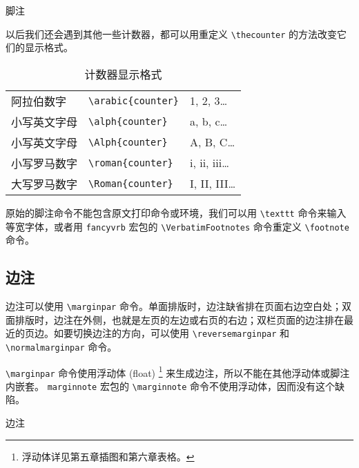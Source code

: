 \begin{example}[h]
\begin{Code}[numbers=left]
\renewcommand{\thefootnote}{\roman{footnote}} %
\end{Code}
\caption{脚注}
\label{exa:footnote}
\end{example}

以后我们还会遇到其他一些计数器，都可以用重定义 \verb|\thecounter| 的方法改变它们的显示格式。

\begin{table}
\centering
\caption{计数器显示格式}
\label{tab:counter_format}
\begin{tabular}{lll}
    \toprule
    阿拉伯数字 & \verb|\arabic{counter}| & 1, 2, 3\dots \\
    小写英文字母 & \verb|\alph{counter}| & a, b, c\dots \\
    小写英文字母 & \verb|\Alph{counter}| & A, B, C\dots \\
    小写罗马数字 & \verb|\roman{counter}| & i, ii, iii\dots \\
    大写罗马数字 & \verb|\Roman{counter}| & I, II, III\dots \\
    \bottomrule
\end{tabular}
\end{table}

原始的脚注命令不能包含原文打印命令或环境，我们可以用 \verb|\texttt| 命令来输入等宽字体，或者用 \texttt{fancyvrb} 宏包的 \verb|\VerbatimFootnotes| 命令重定义 \verb|\footnote| 命令。

\subsection{边注}

边注可以使用 \verb|\marginpar| 命令。单面排版时，边注缺省排在页面右边空白处；双面排版时，边注在外侧，也就是左页的左边或右页的右边；双栏页面的边注排在最近的页边。如要切换边注的方向，可以使用 \verb|\reversemarginpar| 和 \verb|\normalmarginpar| 命令。

\verb|\marginpar| 命令使用浮动体 (float) \footnote{浮动体详见第五章插图和第六章表格。} 来生成边注，所以不能在其他浮动体或脚注内嵌套。 \texttt{marginnote} 宏包的 \verb|\marginnote| 命令不使用浮动体，因而没有这个缺陷。

\begin{example}[h]
\reversemarginpar
{}
\normalmarginpar

\begin{Code}[]
\reversemarginpar
{}
\normalmarginpar
\end{Code}
\caption{边注}
\end{example}

